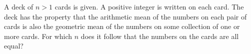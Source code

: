 A deck of $n > 1$ cards is given.
A positive integer is written on each card.
The deck has the property that the arithmetic mean of the
numbers on each pair of cards is also the
geometric mean of the numbers on some collection of one or more cards.
For which $n$ does it follow that the numbers on the cards are all equal?